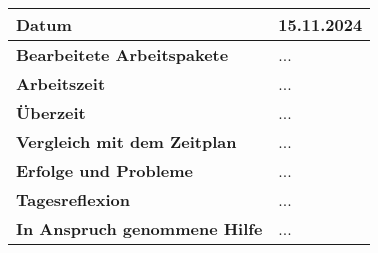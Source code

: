 \begin{longtable}{p{}|p{}}
	\hline
	\textbf{Datum}                       & 15.11.2024 \\
	\hline
	\textbf{Bearbeitete Arbeitspakete}   & ... \\
	\hline
	\textbf{Arbeitszeit}                 & ... \\
	\hline
	\textbf{Überzeit}                    & ... \\
	\hline
	\textbf{Vergleich mit dem Zeitplan}  & ... \\
	\hline
	\textbf{Erfolge und Probleme}        & ...
	\\
	\hline
	\textbf{Tagesreflexion}              & ...
	\\
	\hline
	\textbf{In Anspruch genommene Hilfe} & ... \\
	\hline
\end{longtable}\label{tab:arbeitsprotokoll-tag6}
\newpage


